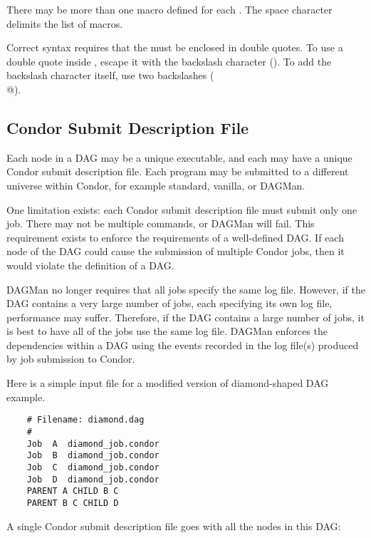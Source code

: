 There may be more than one macro defined for each .
The space character delimits the list of macros.

Correct syntax requires that the \verb@string@ must be
enclosed in double quotes.
To use a double quote inside \verb@string@,
escape it with the backslash character (\verb@\@).
To add the backslash character itself, use two backslashes (\verb@\\@).



\subsection{Condor Submit Description File}

Each node in a DAG may be a unique executable, and each may have a unique
Condor submit description file.
Each program may be submitted to a different universe
within Condor, for example standard,
vanilla, or DAGMan.

One limitation exists:
each Condor submit description file must submit only one job.
There may not be multiple \verb@queue@ commands, or DAGMan will fail.
This requirement exists to enforce the requirements of a well-defined DAG.
If each node of the DAG could cause the submission of multiple
Condor jobs, then it would violate the definition of a DAG.

DAGMan no longer requires that all jobs specify the same log file.
However, if the DAG contains a very large number of jobs, each
specifying its own log file, performance may suffer.  Therefore,
if the DAG contains a large number of jobs, it is best to have
all of the jobs use the same log file.
DAGMan enforces the dependencies within a DAG
using the events recorded in the
log file(s) produced by job submission to Condor.

Here is a simple input file for a 
modified version of diamond-shaped DAG example.

\begin{verbatim}
	# Filename: diamond.dag
	#
	Job  A  diamond_job.condor 
	Job  B  diamond_job.condor 
	Job  C  diamond_job.condor	
	Job  D  diamond_job.condor
	PARENT A CHILD B C
	PARENT B C CHILD D
\end{verbatim}

A single Condor submit description file goes with all the nodes
in this DAG:

